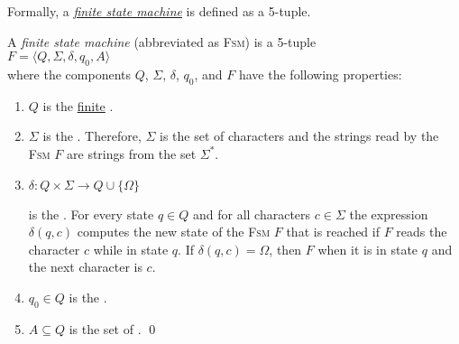 \noindent
Formally, a \href{http://en.wikipedia.org/wiki/Finite-state_machine}{\emph{finite state machine}} 
is defined as a 5-tuple.
\begin{Definition}
A \emph{finite state machine} (abbreviated as \textsc{Fsm}) is a 5-tuple 
\\[0.2cm]
\hspace*{1.3cm}
$F = \langle Q, \Sigma, \delta, q_0, A\rangle$
\\[0.2cm]
where the components $Q$, $\Sigma$, $\delta$, $q_0$, and $F$ have the following properties:
\begin{enumerate}
\item $Q$ is the \underline{finite} .
\item $\Sigma$ is the  \index{$\Sigma$}.  Therefore, $\Sigma$ is the
      set of characters and 
      the strings read by the \textsc{Fsm} $F$ are strings from the set $\Sigma^*$.
\item $\delta: Q \times \Sigma \rightarrow Q \cup \{ \Omega \}$

      is the  .  For every state $q\in Q$ and for all
      characters $c \in \Sigma$ the expression $\delta(q,c)$ computes the new state of the \textsc{Fsm} $F$
      that is reached if $F$ reads the character $c$ while in state $q$.
      If $\delta(q,c) = \Omega$, then $F$  when it is in state $q$ and the next character
      is $c$. 
\item $q_0 \in Q$ is the . 
\item $A \subseteq Q$ is the set of . 
      \qed
\end{enumerate}
\end{Definition}


